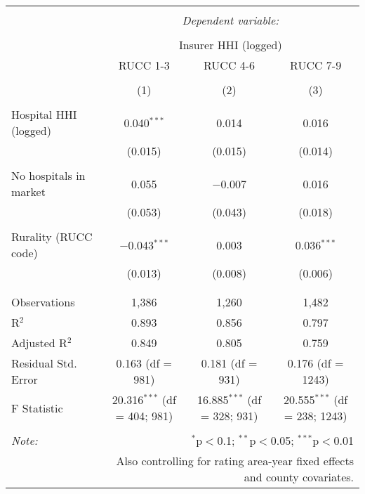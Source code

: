 
\begingroup 
\scriptsize 
\begin{tabular}{@{\extracolsep{5pt}}lccc} 
\\[-1.8ex]\hline 
\hline \\[-1.8ex] 
 & \multicolumn{3}{c}{\textit{Dependent variable:}} \\ 
\cline{2-4} 
\\[-1.8ex] & \multicolumn{3}{c}{Insurer HHI (logged)} \\ 
 & RUCC 1-3 & RUCC 4-6 & RUCC 7-9 \\ 
\\[-1.8ex] & (1) & (2) & (3)\\ 
\hline \\[-1.8ex] 
 Hospital HHI (logged) & 0.040$^{***}$ & 0.014 & 0.016 \\ 
  & (0.015) & (0.015) & (0.014) \\ 
  & & & \\ 
 No hospitals in market & 0.055 & $-$0.007 & 0.016 \\ 
  & (0.053) & (0.043) & (0.018) \\ 
  & & & \\ 
 Rurality (RUCC code) & $-$0.043$^{***}$ & 0.003 & 0.036$^{***}$ \\ 
  & (0.013) & (0.008) & (0.006) \\ 
  & & & \\ 
\hline \\[-1.8ex] 
Observations & 1,386 & 1,260 & 1,482 \\ 
R$^{2}$ & 0.893 & 0.856 & 0.797 \\ 
Adjusted R$^{2}$ & 0.849 & 0.805 & 0.759 \\ 
Residual Std. Error & 0.163 (df = 981) & 0.181 (df = 931) & 0.176 (df = 1243) \\ 
F Statistic & 20.316$^{***}$ (df = 404; 981) & 16.885$^{***}$ (df = 328; 931) & 20.555$^{***}$ (df = 238; 1243) \\ 
\hline 
\hline \\[-1.8ex] 
\textit{Note:}  & \multicolumn{3}{r}{$^{*}$p$<$0.1; $^{**}$p$<$0.05; $^{***}$p$<$0.01} \\ 
 & \multicolumn{3}{r}{Also controlling for rating area-year fixed effects and county covariates.} \\ 
\end{tabular} 
\endgroup 
